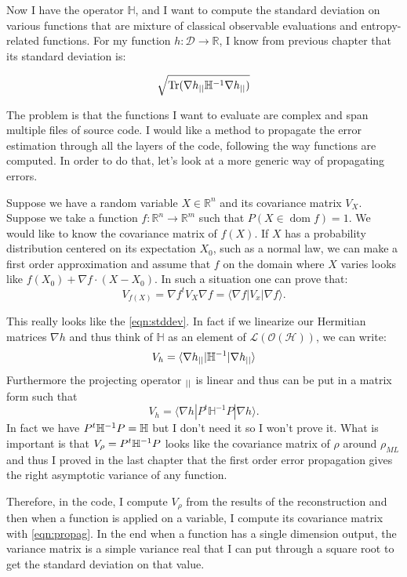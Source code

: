 \documentclass[10pt,a4paper]{report}
\theoremstyle{plain}
\theoremstyle{definition}
\theoremstyle{remark}
\newcommand{\R}{\ensuremath{\mathbb{R}}}
\newcommand{\ket}[1]{|#1\rangle}
\newcommand{\bra}[1]{\langle#1|}
\DeclareMathOperator{\Tr}{Tr}
\DeclareMathOperator{\dom}{dom}
\newcommand{\ml}{_{M\!L}}
\begin{document}
Now I have the operator $\mathbb H$, and I want to compute the standard
deviation on various functions that are mixture of classical observable
evaluations and entropy-related functions. For my function $h: \mathcal{D} \to
\R$, I know from previous chapter that its standard deviation is:

\begin{equation}\label{eqn:stddev}
  \sqrt{\Tr(\nabla h\pr\mathbb H\inv \nabla h\pr)}
\end{equation}

The problem is that the functions I want to evaluate are complex and span
multiple files of source code. I would like a method to propagate the error
estimation through all the layers of the code, following the way functions are
computed. In order to do that, let's look at a more generic way of propagating
errors.

Suppose we have a random variable $X \in \R^n$ and its covariance matrix $V_X$.
Suppose we take a function $f : \R^n \to \R^m$ such that $P(X \in \dom f) = 1$.
We would like to know the covariance matrix of $f(X)$.
If $X$ has a probability distribution centered on its expectation $X_0$, such as
a normal law, we can make a first order approximation and assume that $f$ on the
domain where $X$ varies looks like $f(X_0) + \nabla f \cdot (X-X_0)$. In such a
situation one can prove that:
\begin{equation}\label{eqn:propag}
  V_{f(X)} = \nabla f^t V_X \nabla f = \bra {\nabla f} V_x \ket {\nabla f}.
\end{equation}


This really looks like the \cref{eqn:stddev}. In fact if we linearize our
Hermitian matrices $\nabla h$
and thus think of $\mathbb H$ as an element of
$\mathcal{L}(\mathcal{O}(\mathcal{H}))$, we can write:
\[V_h = \bra {\nabla h\pr} \mathbb H^{-1} \ket{\nabla h\pr}\]
Furthermore the projecting operator $_{||}$ is linear and thus can be put in a
matrix form such that
\[V_h = \bra{\nabla h}P^t\mathbb H^{-1}P \ket{\nabla h}.\]
In fact we have $P^t \mathbb H^{-1} P = \mathbb H$ but I don't need it so I
won't prove it. What is important is that $V_\rho = P^t \mathbb H^{-1} P$ looks
like the covariance matrix of $\rho$ around $\rho\ml$ and thus I proved in the last chapter
that the first order error propagation gives the right asymptotic variance of
any function.

Therefore, in the code, I compute $V_\rho$ from the results of the
reconstruction and then when a function is applied on a variable, I compute its
covariance matrix with \cref{eqn:propag}. In the end when a function has a
single dimension output, the variance matrix is a simple variance real that I can put
through a square root to get the standard deviation on that value.
\end{document}
